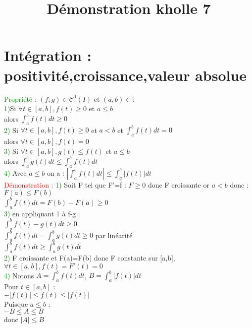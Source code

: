 \documentclass{article}
\begin{document}
\title{Démonstration kholle 7}
\date{}
\maketitle
	\renewcommand{\thesection}{\Roman{section}}
	\setlength{\parindent}{1.5cm}
	\section{Intégration : positivité,croissance,valeur absolue}
	\textcolor{green}{Propriété :} $(f;g) \in \mathcal{C}^0(I)$ et $(a,b)\in \mathbb{I}$ \\
	\textcolor{green}{1)}Si $\forall t \in [a,b], f(t)\geq 0$ et $a \leq b$ \\ 
	alors $\int_{a}^bf(t)dt\geq 0$ \\ 
	\textcolor{green}{2)} Si $\forall t \in [a,b], f(t)\geq 0$ et $a < b$ et $\int_{a}^bf(t)dt=0$ \\ 
	alors $\forall t \in [a,b],f(t)=0$ \\ 
	\textcolor{green}{3)} Si $\forall t \in [a,b], g(t) \leq f(t)$ et $a \leq b$ \\ 
	alors $\int_a^bg(t)dt\leq \int_a^bf(t)dt$ \\
	\textcolor{green}{4)} Avec $a \leq b$ on a : $|\int_{a}^bf(t)dt|\leq \int_{a}^b|f(t)|dt$ \\ 
	\textcolor{red}{Démonstration :} \textcolor{green}{1)} Soit F tel que F'=f : $F \geq 0$ donc F croissante or $a < b$ donc : \\ 
	$F(a)\leq F(b)$ \\ 
	$\int_{a}^bf(t)dt = F(b)-F(a)\geq 0$ \\ 
	\textcolor{green}{3)} en appliquant \textcolor{green}{1} à f-g : \\ 
	$\int_{a}^bf(t)-g(t)dt \geq 0$ \\ 
	$\int_{a}^bf(t)dt-\int_{a}^bg(t)dt\geq 0$ par linéarité \\ 
	$\int_{a}^bf(t)dt \geq \int_{a}^bg(t)dt$ \\ 
	\textcolor{green}{2)} F croissante et F(a)=F(b) donc F constante sur [a,b], \\ 
	$\forall t \in [a,b],f(t)=F'(t)=0$ \\ 
	\textcolor{green}{4)} Notons $A=\int_{a}^bf(t)dt$, $B=\int_{a}^b|f(t)|dt$ \\ 
	Pour $t \in [a,b]$ : \\ 
	\indent $-|f(t)|\leq f(t) \leq |f(t)|$ \\ 
	Puisque $a \leq b$ : \\ 
	\indent $-B \leq A \leq B$ \\ 
	donc $|A| \leq B $ \\ 
\end{document}
